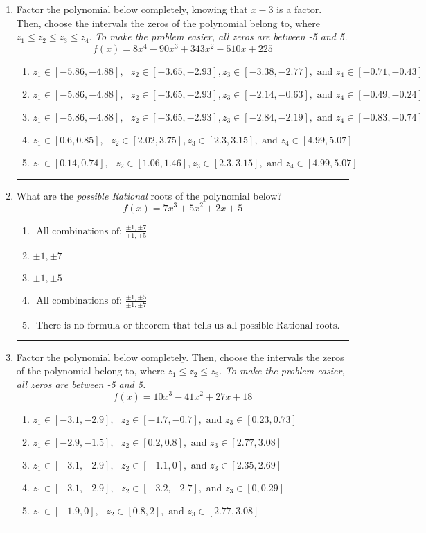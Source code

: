\documentclass[14pt]{extbook}
\newcommand{\litem}[1]{\item#1\hspace*{-1cm}\rule{\textwidth}{0.4pt}}
\begin{document}
\begin{enumerate}
{\begin{enumerate}[label=\Alph*.]
\end{enumerate} }
\litem{
Factor the polynomial below completely, knowing that $x -3$ is a factor. Then, choose the intervals the zeros of the polynomial belong to, where $z_1 \leq z_2 \leq z_3 \leq z_4$. \textit{To make the problem easier, all zeros are between -5 and 5.}\[ f(x) = 8x^{4} -90 x^{3} +343 x^{2} -510 x + 225 \]\begin{enumerate}[label=\Alph*.]
\item \( z_1 \in [-5.86, -4.88], \text{   }  z_2 \in [-3.65, -2.93], z_3 \in [-3.38, -2.77], \text{   and   } z_4 \in [-0.71, -0.43] \)
\item \( z_1 \in [-5.86, -4.88], \text{   }  z_2 \in [-3.65, -2.93], z_3 \in [-2.14, -0.63], \text{   and   } z_4 \in [-0.49, -0.24] \)
\item \( z_1 \in [-5.86, -4.88], \text{   }  z_2 \in [-3.65, -2.93], z_3 \in [-2.84, -2.19], \text{   and   } z_4 \in [-0.83, -0.74] \)
\item \( z_1 \in [0.6, 0.85], \text{   }  z_2 \in [2.02, 3.75], z_3 \in [2.3, 3.15], \text{   and   } z_4 \in [4.99, 5.07] \)
\item \( z_1 \in [0.14, 0.74], \text{   }  z_2 \in [1.06, 1.46], z_3 \in [2.3, 3.15], \text{   and   } z_4 \in [4.99, 5.07] \)

\end{enumerate} }
\litem{
What are the \textit{possible Rational} roots of the polynomial below?\[ f(x) = 7x^{3} +5 x^{2} +2 x + 5 \]\begin{enumerate}[label=\Alph*.]
\item \( \text{ All combinations of: }\frac{\pm 1,\pm 7}{\pm 1,\pm 5} \)
\item \( \pm 1,\pm 7 \)
\item \( \pm 1,\pm 5 \)
\item \( \text{ All combinations of: }\frac{\pm 1,\pm 5}{\pm 1,\pm 7} \)
\item \( \text{ There is no formula or theorem that tells us all possible Rational roots.} \)

\end{enumerate} }
\litem{
Factor the polynomial below completely. Then, choose the intervals the zeros of the polynomial belong to, where $z_1 \leq z_2 \leq z_3$. \textit{To make the problem easier, all zeros are between -5 and 5.}\[ f(x) = 10x^{3} -41 x^{2} +27 x + 18 \]\begin{enumerate}[label=\Alph*.]
\item \( z_1 \in [-3.1, -2.9], \text{   }  z_2 \in [-1.7, -0.7], \text{   and   } z_3 \in [0.23, 0.73] \)
\item \( z_1 \in [-2.9, -1.5], \text{   }  z_2 \in [0.2, 0.8], \text{   and   } z_3 \in [2.77, 3.08] \)
\item \( z_1 \in [-3.1, -2.9], \text{   }  z_2 \in [-1.1, 0], \text{   and   } z_3 \in [2.35, 2.69] \)
\item \( z_1 \in [-3.1, -2.9], \text{   }  z_2 \in [-3.2, -2.7], \text{   and   } z_3 \in [0, 0.29] \)
\item \( z_1 \in [-1.9, 0], \text{   }  z_2 \in [0.8, 2], \text{   and   } z_3 \in [2.77, 3.08] \)


\end{enumerate}}
\end{enumerate}
\end{document}

